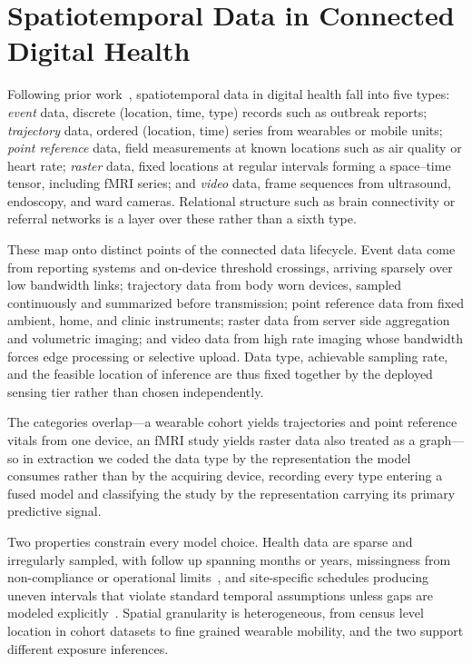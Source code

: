 \documentclass[journal]{IEEEtran}
\newif\ifsubmission
\begin{document}
\fi

\section{Spatiotemporal Data in Connected Digital Health}
\label{sec:data}
\ifsubmission
Following prior work~\cite{wang2022deep,atluri2018stdm}, spatiotemporal data in digital health fall into five types: \emph{event} data, discrete (location, time, type) records such as outbreak reports; \emph{trajectory} data, ordered (location, time) series from wearables or mobile units; \emph{point reference} data, field measurements at known locations such as air quality or heart rate; \emph{raster} data, fixed locations at regular intervals forming a space--time tensor, including fMRI series; and \emph{video} data, frame sequences from ultrasound, endoscopy, and ward cameras. Relational structure such as brain connectivity or referral networks is a layer over these rather than a sixth type.

These map onto distinct points of the connected data lifecycle. Event data come from reporting systems and on-device threshold crossings, arriving sparsely over low bandwidth links; trajectory data from body worn devices, sampled continuously and summarized before transmission; point reference data from fixed ambient, home, and clinic instruments; raster data from server side aggregation and volumetric imaging; and video data from high rate imaging whose bandwidth forces edge processing or selective upload. Data type, achievable sampling rate, and the feasible location of inference are thus fixed together by the deployed sensing tier rather than chosen independently.

The categories overlap---a wearable cohort yields trajectories and point reference vitals from one device, an fMRI study yields raster data also treated as a graph---so in extraction we coded the data type by the representation the model consumes rather than by the acquiring device, recording every type entering a fused model and classifying the study by the representation carrying its primary predictive signal.

Two properties constrain every model choice. Health data are sparse and irregularly sampled, with follow up spanning months or years, missingness from non-compliance or operational limits~\cite{che2018grud}, and site-specific schedules producing uneven intervals that violate standard temporal assumptions unless gaps are modeled explicitly~\cite{shukla2021irregular}. Spatial granularity is heterogeneous, from census level location in cohort datasets to fine grained wearable mobility, and the two support different exposure inferences.
\end{document}
